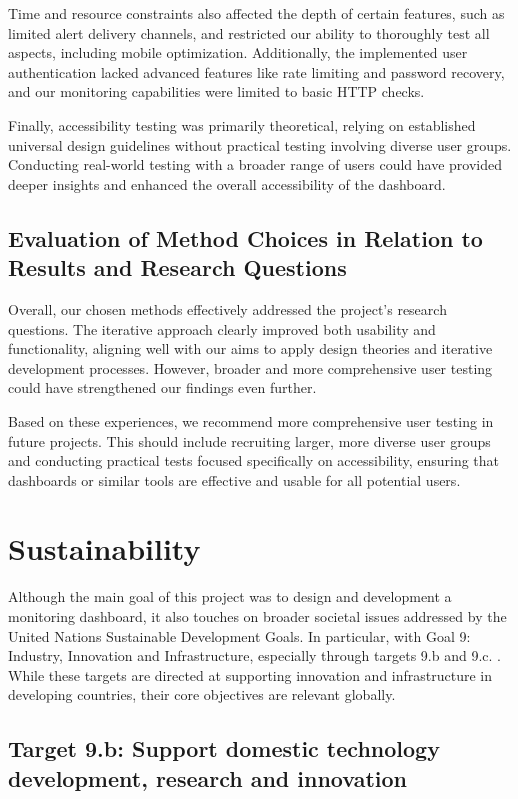 Time and resource constraints also affected the depth of certain features, such as limited alert delivery channels, and restricted our ability to thoroughly test all aspects, including mobile optimization. Additionally, the implemented user authentication lacked advanced features like rate limiting and password recovery, and our monitoring capabilities were limited to basic HTTP checks.

Finally, accessibility testing was primarily theoretical, relying on established universal design guidelines without practical testing involving diverse user groups. Conducting real-world testing with a broader range of users could have provided deeper insights and enhanced the overall accessibility of the dashboard.


\subsection{Evaluation of Method Choices in Relation to Results and Research Questions}
Overall, our chosen methods effectively addressed the project's research questions. The iterative approach clearly improved both usability and functionality, aligning well with our aims to apply design theories and iterative development processes. However, broader and more comprehensive user testing could have strengthened our findings even further.

Based on these experiences, we recommend more comprehensive user testing in future projects. This should include recruiting larger, more diverse user groups and conducting practical tests focused specifically on accessibility, ensuring that dashboards or similar tools are effective and usable for all potential users.


\section{Sustainability}
\label{sec:sustainability}
Although the main goal of this project was to design and development a monitoring dashboard, it also touches on broader societal issues addressed by the United Nations Sustainable Development Goals. In particular, with Goal 9: Industry, Innovation and Infrastructure, especially through targets 9.b and 9.c. \autocite{sustainability}. While these targets are directed at supporting innovation and infrastructure in developing countries, their core objectives are relevant globally. 

\subsection{Target 9.b: Support domestic technology development, research and innovation}


